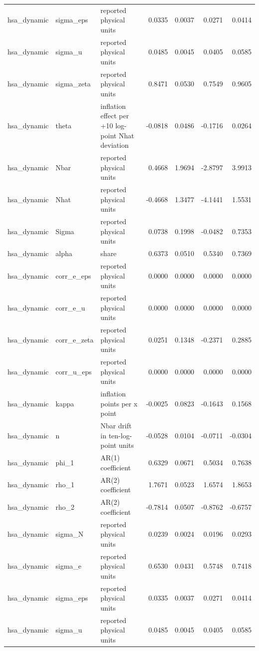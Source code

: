 \begin{tabular}{lllrrrr}
hsa\_dynamic & sigma\_eps & reported physical units & 0.0335 & 0.0037 & 0.0271 & 0.0414 \\
hsa\_dynamic & sigma\_u & reported physical units & 0.0485 & 0.0045 & 0.0405 & 0.0585 \\
hsa\_dynamic & sigma\_zeta & reported physical units & 0.8471 & 0.0530 & 0.7549 & 0.9605 \\
hsa\_dynamic & theta & inflation effect per +10 log-point Nhat deviation & -0.0818 & 0.0486 & -0.1716 & 0.0264 \\
hsa\_dynamic & Nbar & reported physical units & 0.4668 & 1.9694 & -2.8797 & 3.9913 \\
hsa\_dynamic & Nhat & reported physical units & -0.4668 & 1.3477 & -4.1441 & 1.5531 \\
hsa\_dynamic & Sigma & reported physical units & 0.0738 & 0.1998 & -0.0482 & 0.7353 \\
hsa\_dynamic & alpha & share & 0.6373 & 0.0510 & 0.5340 & 0.7369 \\
hsa\_dynamic & corr\_e\_eps & reported physical units & 0.0000 & 0.0000 & 0.0000 & 0.0000 \\
hsa\_dynamic & corr\_e\_u & reported physical units & 0.0000 & 0.0000 & 0.0000 & 0.0000 \\
hsa\_dynamic & corr\_e\_zeta & reported physical units & 0.0251 & 0.1348 & -0.2371 & 0.2885 \\
hsa\_dynamic & corr\_u\_eps & reported physical units & 0.0000 & 0.0000 & 0.0000 & 0.0000 \\
hsa\_dynamic & kappa & inflation points per x point & -0.0025 & 0.0823 & -0.1643 & 0.1568 \\
hsa\_dynamic & n & Nbar drift in ten-log-point units & -0.0528 & 0.0104 & -0.0711 & -0.0304 \\
hsa\_dynamic & phi\_1 & AR(1) coefficient & 0.6329 & 0.0671 & 0.5034 & 0.7638 \\
hsa\_dynamic & rho\_1 & AR(2) coefficient & 1.7671 & 0.0523 & 1.6574 & 1.8653 \\
hsa\_dynamic & rho\_2 & AR(2) coefficient & -0.7814 & 0.0507 & -0.8762 & -0.6757 \\
hsa\_dynamic & sigma\_N & reported physical units & 0.0239 & 0.0024 & 0.0196 & 0.0293 \\
hsa\_dynamic & sigma\_e & reported physical units & 0.6530 & 0.0431 & 0.5748 & 0.7418 \\
hsa\_dynamic & sigma\_eps & reported physical units & 0.0335 & 0.0037 & 0.0271 & 0.0414 \\
hsa\_dynamic & sigma\_u & reported physical units & 0.0485 & 0.0045 & 0.0405 & 0.0585 \\

\end{tabular}
